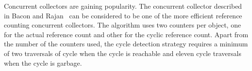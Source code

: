 
Concurrent collectors are gaining popularity. The concurrent collector described in Bacon and Rajan~\cite{Bacon2001} can be considered to be one of the more efficient reference counting concurrent collectors. The algorithm uses two counters per object, one for the actual reference count and other for the cyclic reference count. Apart from the number of the counters used, the cycle detection strategy requires a minimum of two traversals of cycle when the cycle is reachable and eleven cycle traversals when the cycle is garbage.

